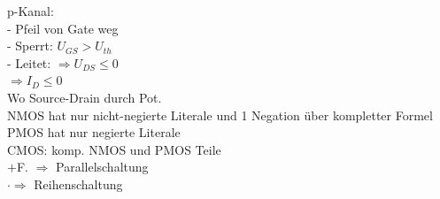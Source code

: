 \documentclass[8pt]{extarticle}
\begin{document}
\begin{minipage}{0.33\textwidth}
p-Kanal:\\
- Pfeil von Gate weg\\
- Sperrt: $U_{GS} > U_{th}$\\
- Leitet: $\Rightarrow U_{DS} \leq 0$\\
\phantom{ssssisisssi}$\Rightarrow I_D \leq 0$\\
Wo Source-Drain durch Pot.\\
NMOS hat nur nicht-negierte Literale und 1 Negation über kompletter Formel\\
PMOS hat nur negierte Literale\\
CMOS: komp. NMOS und PMOS Teile\\
$+$F. $\Rightarrow$ Parallelschaltung\\
$\mathbf{\cdot} \Rightarrow$ Reihenschaltung\\
\end{minipage}
~~~~~~~
\end{document}
